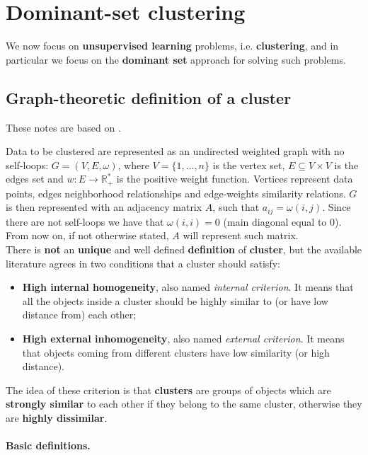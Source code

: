 \section{Dominant-set clustering}\label{ch5} 
We now focus on \textbf{unsupervised learning} problems, i.e. \textbf{clustering}, and in particular we focus on the \textbf{dominant set} approach for solving such problems.

\subsection{Graph-theoretic definition of a cluster}
These notes are based on \cite{pavan2006dominant}.

Data to be clustered are represented as an undirected weighted graph with no self-loops: $G=(V, E, \omega)$, where $V=\{1,\dots,n\}$ is the vertex set, $E\subseteq V\times V$ is the edges set and $w: E\rightarrow \mathbb{R}^*_+$ is the positive weight function. Vertices represent data points, edges neighborhood relationships and edge-weights similarity relations. $G$ is then represented with an adjacency matrix $A$, such that $a_{ij} = \omega(i,j)$. Since there are not self-loops we have that $\omega(i,i) = 0$ (main diagonal equal to $0$). From now on, if not otherwise stated, $A$ will represent such matrix. \\
There is \textbf{not} an \textbf{unique} and well defined \textbf{definition} of \textbf{cluster}, but the available literature agrees in two conditions that a cluster should satisfy:
\begin{itemize}
  \item \textbf{High internal homogeneity}, also named \textit{internal criterion}. It means that all the objects inside a cluster should be highly similar to (or have low distance from) each other;
  \item \textbf{High external inhomogeneity}, also named \textit{external criterion}. It means that objects coming from different clusters have low similarity (or high distance).
\end{itemize}
The idea of these criterion is that \textbf{clusters} are groups of objects which are \textbf{strongly similar} to each other if they belong to the same cluster, otherwise they are \textbf{highly dissimilar}. 

\paragraph{Basic definitions.}

